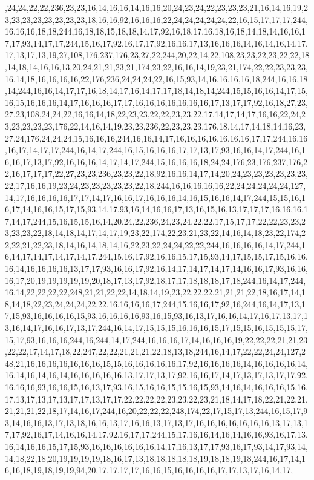,24,24,22,22,236,23,23,16,14,16,16,14,16,16,20,24,23,24,22,23,23,23,21,16,14,16,19,23,23,23,23,23,23,23,23,18,16,16,92,16,16,16,22,24,24,24,24,24,22,16,15,17,17,17,244,16,16,16,18,18,244,16,18,18,15,18,18,14,17,92,16,18,17,16,18,16,18,14,18,14,16,16,17,17,93,14,17,17,244,15,16,17,92,16,17,17,92,16,16,17,13,16,16,16,14,16,14,16,14,17,17,13,17,13,19,27,108,176,237,176,23,27,22,244,20,22,14,22,108,23,23,22,23,22,22,18,14,18,14,16,16,13,20,24,21,21,23,21,174,23,22,16,16,14,19,23,21,174,22,22,23,23,23,16,14,18,16,16,16,16,22,176,236,24,24,24,22,16,15,93,14,16,16,16,16,18,244,16,16,18,14,244,16,16,14,17,17,16,18,14,17,16,14,17,17,18,14,18,14,244,15,15,16,16,14,17,15,16,15,16,16,16,14,17,16,16,16,17,17,16,16,16,16,16,16,16,17,13,17,17,92,16,18,27,23,27,23,108,24,24,22,16,16,14,18,22,23,23,22,22,23,23,22,17,14,17,14,17,16,16,22,24,23,23,23,23,23,176,22,14,16,14,19,23,23,236,22,23,23,23,176,18,14,17,14,18,14,16,23,27,24,176,24,24,24,15,16,16,16,244,16,16,14,17,16,16,16,16,16,16,16,17,17,244,16,16,16,17,14,17,17,244,16,14,17,244,16,15,16,16,16,17,17,13,17,93,16,16,14,17,244,16,16,16,17,13,17,92,16,16,16,14,17,14,17,244,15,16,16,16,18,24,24,176,23,176,237,176,22,16,17,17,17,22,27,23,23,236,23,23,22,18,92,16,16,14,17,14,20,24,23,23,23,23,23,23,22,17,16,16,19,23,24,23,23,23,23,23,22,18,244,16,16,16,16,16,22,24,24,24,24,24,127,14,17,16,16,16,16,17,17,14,17,16,16,17,16,16,16,14,16,15,16,16,14,17,244,15,15,16,16,17,14,16,16,15,17,15,93,14,17,93,16,14,16,16,17,13,16,15,16,13,17,17,17,16,16,16,17,14,17,244,15,16,15,15,16,14,20,24,22,236,24,23,24,22,22,17,15,17,17,22,22,23,23,23,23,23,22,18,14,18,14,17,14,17,19,23,22,174,22,23,21,23,22,14,16,14,18,23,22,174,22,22,21,22,23,18,14,16,14,18,14,16,22,23,22,24,24,22,22,244,16,16,16,16,14,17,244,16,14,17,14,17,14,17,14,17,244,15,16,17,92,16,16,15,17,15,93,14,17,15,15,17,15,16,16,16,14,16,16,16,16,13,17,17,93,16,16,17,92,16,14,17,14,17,14,17,14,16,16,17,93,16,16,16,17,20,19,19,19,19,19,20,18,17,13,17,92,18,17,17,18,18,18,17,18,244,16,14,17,244,16,14,22,22,22,22,248,21,21,22,22,14,18,14,19,23,22,22,22,21,21,21,22,18,16,17,14,18,14,18,22,23,24,24,24,22,22,16,16,16,16,17,244,15,16,16,17,92,16,244,16,14,17,13,17,15,93,16,16,16,16,15,93,16,16,16,16,93,16,15,93,16,13,17,16,16,14,17,16,17,13,17,13,16,14,17,16,16,17,13,17,244,16,14,17,15,15,15,16,16,16,15,17,15,15,16,15,15,15,17,15,17,93,16,16,16,244,16,244,14,17,244,16,16,16,17,14,16,16,16,19,22,22,22,21,21,23,22,22,17,14,17,18,22,247,22,22,21,21,21,22,18,13,18,244,16,14,17,22,22,24,24,127,248,21,16,16,16,16,16,16,16,15,15,16,16,16,16,16,17,92,16,16,16,16,14,16,16,16,16,14,16,14,16,14,16,14,16,16,16,16,16,13,17,17,13,17,92,16,16,17,14,17,13,17,13,17,17,92,16,16,16,93,16,16,15,16,13,17,93,16,15,16,16,15,15,16,15,93,14,16,14,16,16,16,15,16,17,13,17,13,17,13,17,17,13,17,17,22,22,22,22,23,23,22,23,21,18,14,17,18,22,21,22,21,21,21,21,22,18,17,14,16,17,244,16,20,22,22,22,248,174,22,17,15,17,13,244,16,15,17,93,14,16,16,13,17,13,18,16,16,13,17,16,16,13,17,13,17,16,16,16,16,16,16,16,13,17,13,17,17,92,16,17,14,16,16,14,17,92,16,17,17,244,15,17,16,16,14,16,14,16,16,93,16,17,13,16,14,16,16,15,17,15,93,16,16,16,16,16,16,14,17,16,13,17,17,93,16,17,93,14,17,93,14,14,18,22,18,20,19,19,19,19,18,16,17,13,18,18,18,18,18,19,18,18,19,18,244,16,17,14,16,16,18,19,18,19,19,94,20,17,17,17,17,16,16,15,16,16,16,16,17,17,13,17,16,14,17,